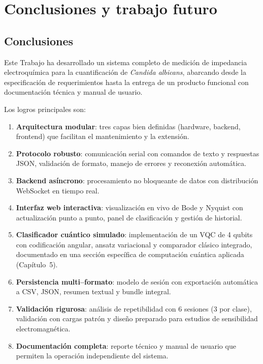 \documentclass[11pt,a4paper,spanish]{book}
\begin{document}
\chapter{Conclusiones y trabajo futuro}

\section{Conclusiones}

Este Trabajo ha desarrollado un sistema completo de medici\'{o}n de impedancia electroqu\'{i}mica para la cuantificaci\'{o}n de \textit{Candida albicans}, abarcando desde la especificaci\'{o}n de requerimientos hasta la entrega de un producto funcional con documentaci\'{o}n t\'{e}cnica y manual de usuario.

Los logros principales son:
\begin{enumerate}
	\item \textbf{Arquitectura modular}: tres capas bien definidas (hardware, backend, frontend) que facilitan el mantenimiento y la extensi\'{o}n.
	\item \textbf{Protocolo robusto}: comunicaci\'{o}n serial con comandos de texto y respuestas JSON, validaci\'{o}n de formato, manejo de errores y reconexi\'{o}n autom\'{a}tica.
	\item \textbf{Backend as\'{i}ncrono}: procesamiento no bloqueante de datos con distribuci\'{o}n WebSocket en tiempo real.
	\item \textbf{Interfaz web interactiva}: visualizaci\'{o}n en vivo de Bode y Nyquist con actualizaci\'{o}n punto a punto, panel de clasificaci\'{o}n y gesti\'{o}n de historial.
	\item \textbf{Clasificador cu\'{a}ntico simulado}: implementaci\'{o}n de un VQC de 4 qubits con codificaci\'{o}n angular, ansatz variacional y comparador cl\'{a}sico integrado, documentado en una secci\'{o}n espec\'{i}fica de computaci\'{o}n cu\'{a}ntica aplicada (Cap\'{i}tulo~5).
	\item \textbf{Persistencia multi--formato}: modelo de sesi\'{o}n con exportaci\'{o}n autom\'{a}tica a CSV, JSON, resumen textual y bundle integral.
	\item \textbf{Validaci\'{o}n rigurosa}: an\'{a}lisis de repetibilidad con 6 sesiones (3 por clase), validaci\'{o}n con cargas patr\'{o}n y dise\~{n}o preparado para estudios de sensibilidad electromagn\'{e}tica.
	\item \textbf{Documentaci\'{o}n completa}: reporte t\'{e}cnico y manual de usuario que permiten la operaci\'{o}n independiente del sistema.
\end{enumerate}
\end{document}
